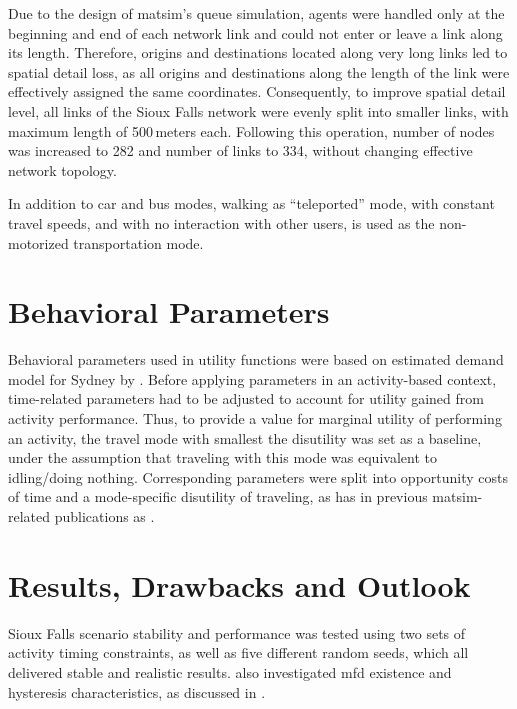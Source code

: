 Due to the design of \gls{matsim}’s queue simulation, agents were handled only at the beginning and end of each network link and could not enter or leave a link along its length. Therefore, origins and destinations located along very long links led to spatial detail loss, as all origins and destinations along the length of the link were effectively assigned the same coordinates. Consequently, to improve spatial detail level, all links of the Sioux Falls network were evenly split into smaller links, with maximum length of 500\,meters each. Following this operation, number of nodes was increased to 282 and number of links to 334, without changing effective network topology.

In addition to car and bus modes, walking as ``\gls{teleported}'' mode, with constant travel speeds, and with no interaction with other users, is used as the non-motorized transportation mode. 

\section{Behavioral Parameters}
Behavioral parameters used in utility functions were based on estimated demand model for Sydney by \citet[][]{TirachiniHensherRose_TransResB_2014}. Before applying parameters in an activity-based context, time-related parameters had to be adjusted to account for utility gained from activity performance. Thus, to provide a value for marginal utility of performing an activity, the travel mode with smallest the disutility was set as a baseline, under the assumption that traveling with this mode was equivalent to idling/doing nothing. Corresponding parameters were split into opportunity costs of time and a mode-specific disutility of traveling, as has in previous \gls{matsim}-related publications as \citet[e.g,][]{KickhoeferEtAl2011PolicyEvaluationIncome}. 

\section{Results, Drawbacks and Outlook}
Sioux Falls scenario stability and performance was tested using two sets of activity timing constraints, as well as five different random seeds, which all delivered stable and realistic results. \citet[][]{ChakirovFourie_TechRep_FCL_2014} also investigated \gls{mfd} existence and hysteresis characteristics, as discussed in \citet[][]{GeroliminisDaganzo_TRB_2007, GeroliminisDaganzo_TransResB_2008, GeroliminisSun_TransResA_2011}. 

